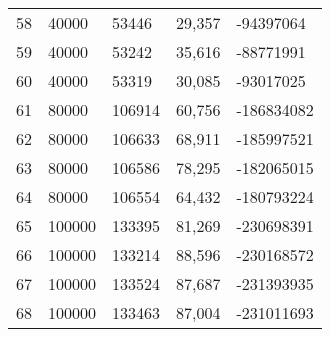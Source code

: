 \begin{longtable}{lllll}
    58               & 40000          & 53446          & 29,357      & -94397064       \\
    59               & 40000          & 53242          & 35,616      & -88771991       \\
    60               & 40000          & 53319          & 30,085      & -93017025       \\
    61               & 80000          & 106914         & 60,756      & -186834082      \\
    62               & 80000          & 106633         & 68,911      & -185997521      \\
    63               & 80000          & 106586         & 78,295      & -182065015      \\
    64               & 80000          & 106554         & 64,432      & -180793224      \\
    65               & 100000         & 133395         & 81,269      & -230698391      \\
    66               & 100000         & 133214         & 88,596      & -230168572      \\
    67               & 100000         & 133524         & 87,687      & -231393935      \\
    68               & 100000         & 133463         & 87,004      & -231011693      
\end{longtable}